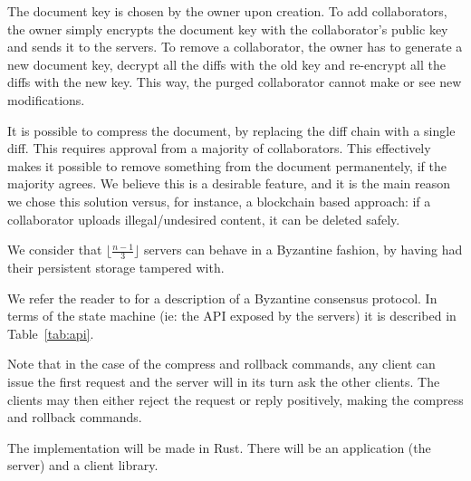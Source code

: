The document key is chosen by the owner upon creation. To add collaborators, the owner
simply encrypts the document key with the collaborator's public
key and sends it to the servers. To remove a collaborator, the
owner has to generate a new document key, decrypt all the diffs
with the old key and re-encrypt all the diffs with the new key.
This way, the purged collaborator cannot make or see new
modifications.

It is possible to compress the document, by replacing the diff
chain with a single diff. This requires approval from a majority
of collaborators. This effectively makes it possible to remove
something from the document permanentely, if the majority agrees.
We believe this is a desirable feature, and it is the main reason
we chose this solution versus, for instance, a blockchain based
approach: if a collaborator uploads illegal/undesired content, it
can be deleted safely.

We consider that $\lfloor \frac{n - 1}{3} \rfloor$ servers can
behave in a Byzantine fashion, by having had their persistent
storage tampered with.

We refer the reader to \cite{pbft} for a description of a Byzantine
consensus protocol. In terms of the state machine (ie: the API
exposed by the servers) it is described in Table~\ref{tab:api}.

Note that in the case of the compress and rollback commands, any
client can issue the first request and the server will in its
turn ask the other clients. The clients may then either reject
the request or reply positively, making the compress and rollback
commands.

The implementation will be made in Rust\cite{rust}. There will be an
application (the server) and a client library.
